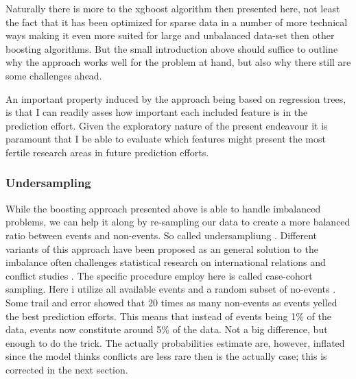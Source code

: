 \documentclass[a4paper]{article}
\begin{document}

Naturally there is more to the xgboost algorithm then presented here, not least the fact that it has been optimized for sparse data in a number of more technical ways making it even more suited for large and unbalanced data-set then other boosting algorithms\cite[5]{Chen_2016}. But the small introduction above should suffice to outline why the approach works well for the problem at hand, but also why there still are some challenges ahead. \par

An important property induced by the approach being based on regression trees, is that I can readily asses how important each included feature is in the prediction effort. Given the exploratory nature of the present endeavour it is paramount that I be able to evaluate which features might present the most fertile research areas in future prediction efforts.\par

\subsubsection{Undersampling}

While the boosting approach presented above is able to handle imbalanced problems, we can help it along by re-sampling our data to create a more balanced ratio between events and non-events. So called undersampliung \citep[1266-1267]{He_2008}. Different variants of this approach have been proposed as an general solution to the imbalance often challenges statistical research on international relations and conflict studies \cite{King_Zeng_2001, king_zeng_2001b}. The specific procedure employ here is called case-cohort sampling. Here i utilize all available events and a random subset of no-events \citep[142]{King_Zeng_2001}. Some trail and error showed that 20 times as many non-events as events yelled the best prediction efforts. This means that instead of events being 1\% of the data, events now constitute around 5\% of the data. Not a big difference, but enough to do the trick. The actually probabilities estimate are, however, inflated since the model thinks conflicts are less rare then is the actually case; this is corrected in the next section.\par
\end{document}
